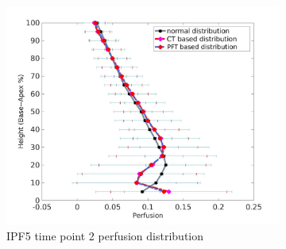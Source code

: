 \begin{figure}[htbp]
\begin{subfigure}{.6\linewidth}
  \includegraphics[width=\linewidth,trim={{.0\wd0} {.0\wd0} {.0\wd0} {.0\wd0}},clip]{Appendix/Image_AppexB/IPF501/IPF501_PerfusionAgainstLungHeight.png}
  \caption{IPF5 time point 2 perfusion distribution}
  \label{fig:IPF501VQDistribution-b}
\end{subfigure}
\begin{subfigure}{.6\linewidth}%

\end{subfigure}
\end{figure}
